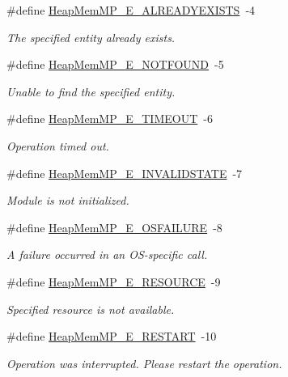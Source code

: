 \begin{DoxyCompactItemize}
\#define \hyperlink{_heap_mem_m_p_8h_a5c0844490d41dbf13f3746f6ff3b0fbb}{HeapMemMP\_\-E\_\-ALREADYEXISTS}~-\/4
\begin{DoxyCompactList}\small\item\em The specified entity already exists. \item\end{DoxyCompactList}\item 
\#define \hyperlink{_heap_mem_m_p_8h_aeee2167e40995fa214c8b26407937513}{HeapMemMP\_\-E\_\-NOTFOUND}~-\/5
\begin{DoxyCompactList}\small\item\em Unable to find the specified entity. \item\end{DoxyCompactList}\item 
\#define \hyperlink{_heap_mem_m_p_8h_a59e36864ebc19f31f38801cd4f6b8927}{HeapMemMP\_\-E\_\-TIMEOUT}~-\/6
\begin{DoxyCompactList}\small\item\em Operation timed out. \item\end{DoxyCompactList}\item 
\#define \hyperlink{_heap_mem_m_p_8h_ae59ad8c5c037aef22e16cf90beabc93c}{HeapMemMP\_\-E\_\-INVALIDSTATE}~-\/7
\begin{DoxyCompactList}\small\item\em Module is not initialized. \item\end{DoxyCompactList}\item 
\#define \hyperlink{_heap_mem_m_p_8h_a125464679440a2d5ec7f80e9a40035c1}{HeapMemMP\_\-E\_\-OSFAILURE}~-\/8
\begin{DoxyCompactList}\small\item\em A failure occurred in an OS-\/specific call. \item\end{DoxyCompactList}\item 
\#define \hyperlink{_heap_mem_m_p_8h_a59a512963c177b9e026486d270c3556f}{HeapMemMP\_\-E\_\-RESOURCE}~-\/9
\begin{DoxyCompactList}\small\item\em Specified resource is not available. \item\end{DoxyCompactList}\item 
\#define \hyperlink{_heap_mem_m_p_8h_a50fc296659efef22fea5863af26930d5}{HeapMemMP\_\-E\_\-RESTART}~-\/10
\begin{DoxyCompactList}\small\item\em Operation was interrupted. Please restart the operation. \item\end{DoxyCompactList}\end{DoxyCompactItemize}
